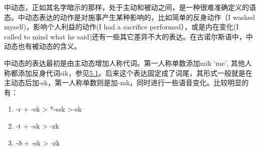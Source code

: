 中动态，正如其名字暗示的那样，处于主动和被动之间，是一种很难准确定义的语态。中动态表达的动作是对施事产生某种影响的，比如简单的反身动作（I
washed myself‌)，影响个人利益的动作(I had a sacrifice
performed），或是内在变化(I called to mind what he
said)还有一些其它差异不大的表达。在古诺尔斯语中，中动态也有被动态的含义。

中动态的表达最初是由主动态增加人称代词。第一人称单数添加mik `me',
其他人称都添加反身代词sik，参见\hyperref[ux4ebaux79f0ux4ee3ux8bcd]{5.1}。后来这个表达固定成了词尾，其形式一般就是在主动态后加-sk，第一人称单数则是加-mk，同时进行一些语音变化。比较明显的有：

\begin{enumerate}
  \def\labelenumi{\arabic{enumi})}
  \item
        -r + -sk \textgreater{} *-ssk \textgreater-sk
  \item
        -t + -sk \textgreater{} -zk
  \item
        -ð + -sk \textgreater{} -zk
\end{enumerate}

